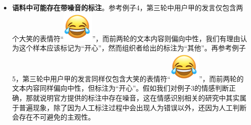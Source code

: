 \begin{itemize}
\item {\bf 语料中可能存在带噪音的标注}。参考例子4，第三轮中用户甲的发言仅包含两个大笑的表情符“\includegraphics[height=1.5\fontcharht\font`\B]{img/emoji/lol.png}”，而前两轮的文本内容则偏向中性，我们有理由认为这个样本应该标记为“开心”，然而组织者给出的标注为“其他”。再参考例子5，第三轮中用户甲的发言同样仅包含大笑的表情符“\includegraphics[height=1.5\fontcharht\font`\B]{img/emoji/lol.png}”，而前两轮的文本内容同样偏向中性，但标注为“开心”。假如我们对例子3的情感判断正确，那就说明官方提供的标注中存在噪音，这在情感识别相关的研究中其实属于普遍现象，除了因为人工标注过程中会出现人为错误以外，还因为人工判断会存在不可避免的主观性。

\end{itemize}


